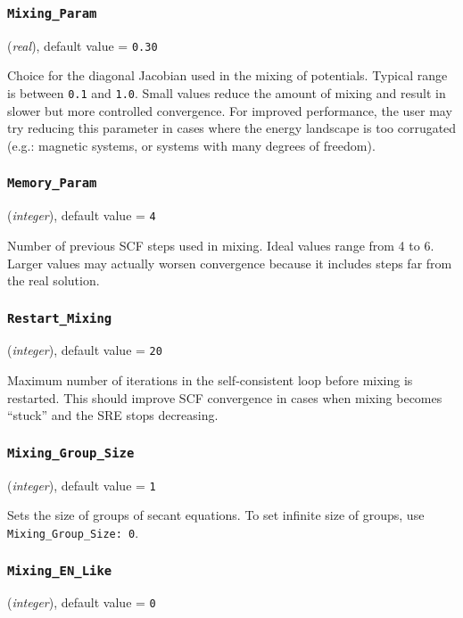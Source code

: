 \documentclass{article}
\begin{document}
\subsubsection{\tt Mixing\_Param 
\label{MixingParam}}
({\it real}),
default value = {\tt 0.30 }

Choice for the diagonal Jacobian used in the mixing of potentials. Typical
range is between {\tt 0.1} and {\tt 1.0}. Small values reduce the amount
of mixing and result in slower but more controlled convergence. For improved
performance, the user may try reducing this parameter in cases where
the energy landscape is too corrugated (e.g.: magnetic systems, or systems
with many degrees of freedom).

\subsubsection{\tt Memory\_Param 
\label{MemoryParam}}
({\it integer}),
default value = {\tt 4 }

Number of previous SCF steps used in mixing. Ideal values range from 4 to 6.
Larger values may actually worsen convergence because it includes steps far
from the real solution.

\subsubsection{\tt Restart\_Mixing 
\label{RestartMixing}}
({\it integer}),
default value = {\tt 20 }

Maximum number of iterations in the self-consistent loop before mixing
is restarted. This should improve SCF convergence in cases when mixing
becomes ``stuck'' and the SRE stops decreasing.

\subsubsection{\tt Mixing\_Group\_Size
\label{MixingGroupSize}}
({\it integer}),
default value = {\tt 1 }

Sets the size of groups of secant equations. To set infinite
size of groups, use {\tt Mixing\_Group\_Size: 0}.

\subsubsection{\tt Mixing\_EN\_Like
\label{MixingENLike}}
({\it integer}),
default value = {\tt 0 }
\end{document}

